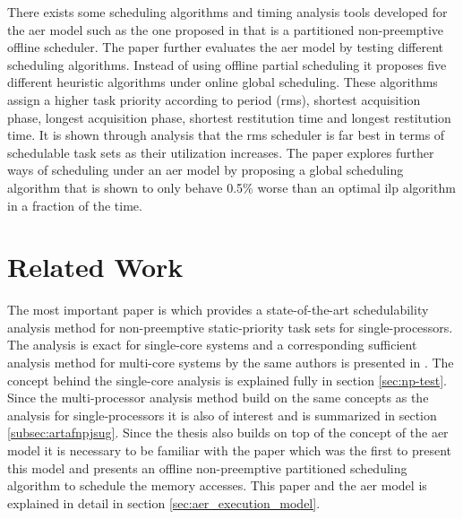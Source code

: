 \documentclass{kththesis}
\begin{document}
There exists some scheduling algorithms and timing analysis tools developed for the \acrshort{aer}
model such as the one proposed in \parencite{durrieu_predictable_2014} that is a partitioned
non-preemptive offline scheduler. The paper \parencite{maia_closer_2016} further evaluates the
\acrshort{aer} model by testing different scheduling algorithms. Instead of using offline partial
scheduling it proposes five different heuristic algorithms under online global scheduling. These
algorithms assign a higher task priority according to period (\acrshort{rms}), shortest acquisition
phase, longest acquisition phase, shortest restitution time and longest restitution time. It is
shown through analysis that the \acrshort{rms} scheduler is far best in terms of schedulable task
sets as their utilization increases. The paper \parencite{becker_contention-free_2016} explores
further ways of scheduling under an \acrshort{aer} model by proposing a global scheduling algorithm
that is shown to only behave 0.5\% worse than an optimal \acrfull{ilp} algorithm in a fraction of
the time.



\section{Related Work} \label{sec:related_work}

The most important paper is \parencite{nasri_exact_2017} which provides a state-of-the-art
schedulability analysis method for non-preemptive static-priority task sets for single-processors.
The analysis is exact for single-core systems and a corresponding sufficient analysis method for
multi-core systems by the same authors is presented in \parencite{nasri_response-time_2018}. The
concept behind the single-core analysis is explained fully in section \ref{sec:np-test}. Since the
multi-processor analysis method build on the same concepts as the analysis for single-processors it
is also of interest and is summarized in section \ref{subsec:artafnpjsug}. Since the thesis also
builds on top of the concept of the \acrshort{aer} model it is necessary to be familiar with the
paper \parencite{durrieu_predictable_2014} which was the first to present this model and presents an
offline non-preemptive partitioned scheduling algorithm to schedule the memory accesses. This paper
and the \acrshort{aer} model is explained in detail in section \ref{sec:aer_execution_model}.
\end{document}
